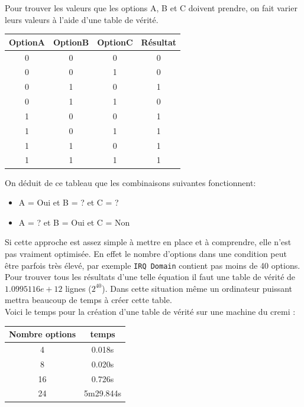 \documentclass[16pts]{report}
\begin{document}
Pour trouver les valeurs que les options A, B et C doivent prendre, on fait
varier leurs valeurs à l'aide d'une table de vérité.  \\
\begin{tabular}{|c|c|c||c|}
    \hline
    OptionA & OptionB & OptionC & Résultat\\
    \hline
    \hline
    0 & 0 & 0 & 0\\
    \hline
    0 & 0 & 1 & 0\\
    \hline
    0 & 1 & 0 & 1\\
    \hline
    0 & 1 & 1 & 0\\
    \hline
    1 & 0 & 0 & 1\\
    \hline
    1 & 0 & 1 & 1\\
    \hline
    1 & 1 & 0 & 1\\
    \hline
    1 & 1 & 1 & 1\\
    \hline
\end{tabular}

On déduit de ce tableau que les combinaisons suivantes fonctionnent:
\begin{itemize}
    \item A = Oui et B = ?   et C = ?   \\
    \item A = ?   et B = Oui et C = Non \\
\end{itemize}

Si cette approche est assez simple à mettre en place et à comprendre, elle
n'est pas vraiment optimisée. En effet le nombre d'options dans une condition
peut être parfois très élevé, par exemple \verb|IRQ Domain| contient pas
moins de 40 options.\\
Pour trouver tous les résultats d'une telle équation il faut une table
de vérité de $1.0995116e+12$ lignes ($2^{40}$). Dans cette situation même
un ordinateur puissant mettra beaucoup de temps à créer cette table.
\\
Voici le temps pour la création d'une table de vérité sur une machine du cremi : 

\begin{tabular}{|c|c|}
    \hline
    Nombre options & temps\\
    \hline
    \hline
    4 & 0.018s\\
    \hline
    8 & 0.020s\\
    \hline
    16 & 0.726s\\
    \hline
    24 & 5m29.844s\\
    \hline
\end{tabular}
\end{document}
